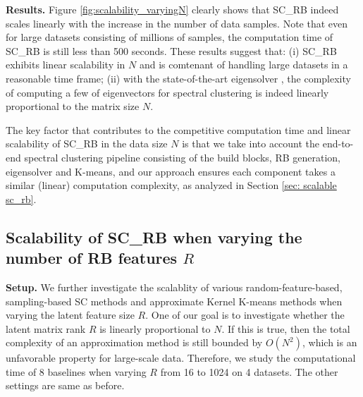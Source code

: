 \documentclass[sigconf]{acmart}
\newcommand{\1}{\boldsymbol{1}}
\newcommand{\0}{\boldsymbol{0}}
\begin{document}
\textbf{Results.} Figure \ref{fig:scalability_varyingN} clearly shows that SC\_RB indeed scales linearly with the increase in the number of data samples.
Note that even for large datasets consisting of millions of samples, the computation time of SC\_RB is still less than 500 seconds. These results suggest that: (i) SC\_RB exhibits linear scalability in $N$ and is comtenant of handling large datasets in a reasonable time frame; (ii) with the state-of-the-art eigensolver \cite{wu2017primme_svds}, the complexity of computing a few of eigenvectors for spectral clustering is indeed linearly proportional to the matrix size $N$. 

The key factor that contributes to the competitive computation time and linear scalability of  SC\_RB in the data size $N$ is that we take into account the end-to-end spectral clustering pipeline consisting of the build blocks, RB generation, eigensolver and K-means, and our approach ensures each component takes a similar (linear) computation complexity, as analyzed in Section \ref{sec: scalable sc_rb}.


\subsection{Scalability of SC\_RB when varying the number of RB features $R$}

\textbf{Setup.} We further investigate the scalablity of various random-feature-based, sampling-based SC methods and approximate Kernel K-means methods when varying the latent feature size $R$. One of our goal is to investigate whether the latent matrix rank $R$ is linearly proportional to $N$. If this is true, then the total complexity of an approximation method is still bounded by $O(N^2)$, which is an unfavorable property for large-scale data. Therefore, we study the computational time of 8 baselines when varying $R$ from 16 to 1024 on 4 datasets. The other settings are same as before. 
\end{document}
